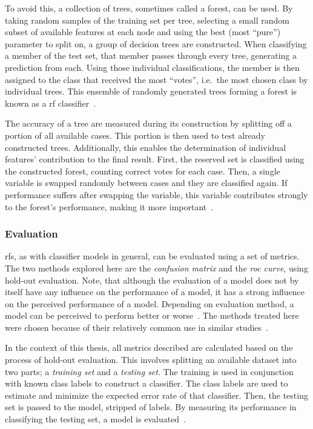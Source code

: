 To avoid this, a collection of trees, sometimes called a forest, can be used. By
taking random samples of the training set per tree, selecting a small random subset of 
available features at each node and using the best (most \enquote{pure}) parameter to split on, a group of decision trees are constructed. When 
classifying a member of the test set, that member passes through every tree, 
generating a prediction from each. Using those individual classifications, the
member is then assigned to the class that received the most \enquote{votes}, 
i.e.~the most chosen class by individual trees. This ensemble of randomly 
generated trees forming a forest is known as a \acf{rf} classifier~\cite{random_forests_article,random_forests_web}. 

The accuracy of a tree are measured during its construction by splitting off a
portion of all available cases. This portion is then used to test already 
constructed trees. Additionally, this enables the determination of individual
features' contribution to the final result. First, the reserved set is classified
using the constructed forest, counting correct votes for each case. Then, a 
single variable is swapped randomly between cases and they are classified again.
If performance suffers after swapping the variable, this variable contributes
strongly to the forest's performance, making it more 
important~\cite{random_forests_article,random_forests_web}. 

\subsubsection{Evaluation}

\acp{rf}, as with classifier models in general, can be evaluated using a set of
metrics. The two methods explored here are the \textit{confusion matrix} and 
the \textit{\acf{roc} curve}, using hold-out evaluation. Note, that although the evaluation of a model 
does not by itself have any influence on the performance of a model, it has a
strong influence on the perceived performance of a model. Depending on 
evaluation method, a model can be perceived to perform better or 
worse~\cite{evaluating_learning_algorithms}. The methods treated here were 
chosen because of their relatively common use in similar studies~\cite{multisite_rectal_radiomics,radiomics_analysis_pcr_rectal}. %

In the context of this thesis, all metrics described are calculated based
on the process of hold-out evaluation. This involves splitting an available 
dataset into two parts; a \textit{training set} and a \textit{testing set}.
The training is used in conjunction with known class labels to construct a 
classifier. The class labels are used to estimate and minimize the expected 
error rate of that classifier. Then, the testing set is passed to the model,
stripped of labels. By measuring its performance in classifying the testing set,
a model is evaluated~\cite{evaluating_learning_algorithms,fundamentals_of_machine_learning}.

